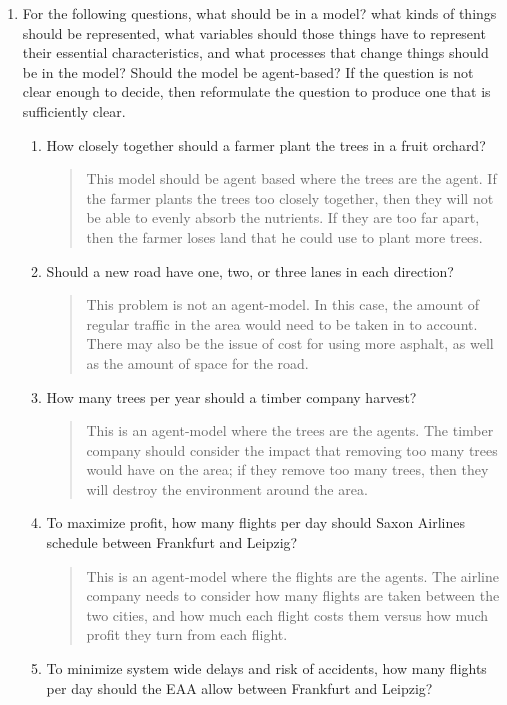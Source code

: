 \documentclass{hw}
\begin{document}
\begin{enumerate}
\item For the following questions, what should be in a model? what kinds of things should be represented,
what variables should those things have to represent their essential characteristics, and what processes
that change things should be in the model? Should the model be agent-based? If the question is not clear
enough to decide, then reformulate the question to produce one that is sufficiently clear.
\begin{enumerate}
\item How closely together should a farmer plant the trees in a fruit orchard?
\begin{quote}
This model should be agent based where the trees are the agent. If the farmer plants the trees too closely
together, then they will not be able to evenly absorb the nutrients. If they are too far apart, then the
farmer loses land that he could use to plant more trees.
\end{quote}
\item Should a new road have one, two, or three lanes in each direction?
\begin{quote}
This problem is not an agent-model. In this case, the amount of regular traffic in the area would need
to be taken in to account. There may also be the issue of cost for using more asphalt, as well as
the amount of space for the road.
\end{quote}
\item How many trees per year should a timber company harvest?
\begin{quote}
This is an agent-model where the trees are the agents. The timber company should consider the impact that
removing too many trees would have on the area; if they remove too many trees, then they will destroy the
environment around the area.
\end{quote}
\item To maximize profit, how many flights per day should Saxon Airlines schedule between Frankfurt and
Leipzig?
\begin{quote}
This is an agent-model where the flights are the agents. The airline company needs to consider how many
flights are taken between the two cities, and how much each flight costs them versus how much profit they
turn from each flight.
\end{quote}
\item To minimize system wide delays and risk of accidents, how many flights per day should the EAA allow
between Frankfurt and Leipzig?
\begin{quote}

\end{quote}
\end{enumerate}
\end{enumerate}
\end{document}
